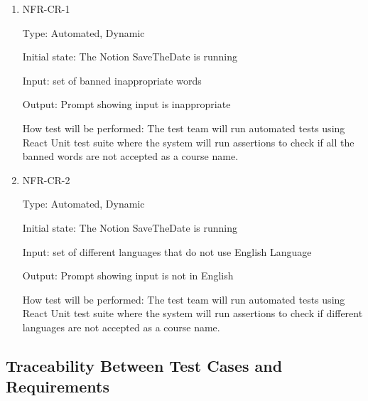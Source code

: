 \documentclass[12pt, titlepage]{article}
\begin{document}
\begin{enumerate}

\item{NFR-CR-1\\}

Type: Automated, Dynamic 

Initial state: The Notion SaveTheDate is running 

Input: set of banned inappropriate words 

Output: Prompt showing input is inappropriate 

How test will be performed: The test team will run automated tests using React Unit test suite where the system will run assertions to check if all the banned words are not accepted as a course name. 

\item{NFR-CR-2\\}

Type: Automated, Dynamic 

Initial state: The Notion SaveTheDate is running 

Input: set of different languages that do not use English Language 

Output: Prompt showing input is not in English 

How test will be performed: The test team will run automated tests using React Unit test suite where the system will run assertions to check if different languages are not accepted as a course name. 

\end{enumerate}

\newpage

\subsection{Traceability Between Test Cases and Requirements}
\end{document}
